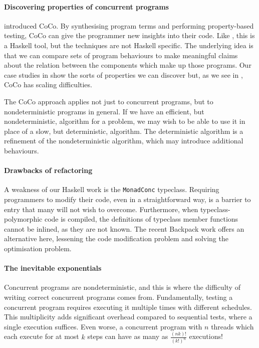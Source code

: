 \paragraph{Discovering properties of concurrent programs}
 introduced CoCo.  By synthesising program terms and
performing property-based testing, CoCo can give the programmer new
insights into their code.  Like \dejafu{}, this is a Haskell tool, but
the techniques are not Haskell specific.  The underlying idea is that
we can compare sets of program behaviours to make meaningful claims
about the relation between the components which make up those
programs.  Our case studies in  show the sorts of
properties we can discover but, as we see in
, CoCo has scaling difficulties.

The CoCo approach applies not just to concurrent programs, but to
nondeterministic programs in general.  If we have an efficient, but
nondeterministic, algorithm for a problem, we may wish to be able to
use it in place of a slow, but deterministic, algorithm.  The
deterministic algorithm is a refinement of the nondeterministic
algorithm, which may introduce additional behaviours.

\paragraph{Drawbacks of refactoring}
A weakness of our Haskell work is the \verb|MonadConc| typeclass.
Requiring programmers to modify their code, even in a straightforward
way, is a barrier to entry that many will not wish to overcome.
Furthermore, when typeclass-polymorphic code is compiled, the
definitions of typeclass member functions cannot be inlined, as they
are not known\cite{peytonjones2002}.  The recent Backpack
work\cite{yang2017} offers an alternative here, lessening the code
modification problem and solving the optimisation problem.

\paragraph{The inevitable exponentials}
Concurrent programs are nondeterministic, and this is where the
difficulty of writing correct concurrent programs comes from.
Fundamentally, testing a concurrent program requires executing it
multiple times with different schedules.  This multiplicity adds
significant overhead compared to sequential tests, where a single
execution suffices.  Even worse, a concurrent program with $n$ threads
which each execute for at most $k$ steps can have as many as
$\frac{(nk)!}{(k!)^{n}}$ executions\cite{musuvathi2007}!

